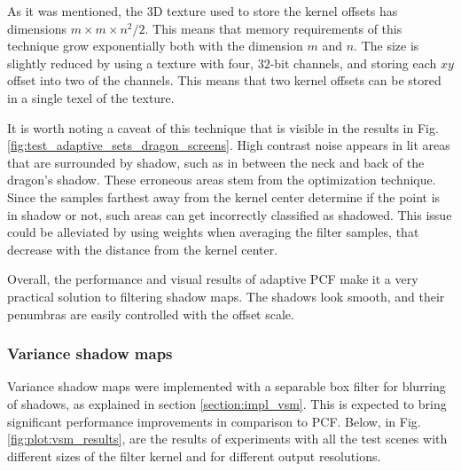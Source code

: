 As it was mentioned, the 3D texture used to store the kernel offsets has dimensions \(m\times m \times n^2/2\). This means that memory requirements of this technique grow exponentially both with the dimension \(m\) and \(n\). The size is slightly reduced by using a texture with four, \(32\)-bit channels, and storing each \(xy\) offset into two of the channels. This means that two kernel offsets can be stored in a single texel of the texture.

It is worth noting a caveat of this technique that is visible in the results in Fig. \ref{fig:test_adaptive_sets_dragon_screens}. High contrast noise appears in lit areas that are surrounded by shadow, such as in between the neck and back of the dragon's shadow. These erroneous areas stem from the optimization technique. Since the samples farthest away from the kernel center determine if the point is in shadow or not, such areas can get incorrectly classified as shadowed. This issue could be alleviated by using weights when averaging the filter samples, that decrease with the distance from the kernel center.

Overall, the performance and visual results of adaptive PCF make it a very practical solution to filtering shadow maps. The shadows look smooth, and their penumbras are easily controlled with the offset scale.

\subsubsection{Variance shadow maps}
Variance shadow maps were implemented with a separable box filter for blurring of shadows, as explained in section \ref{section:impl_vsm}. This is expected to bring significant performance improvements in comparison to PCF. Below, in Fig. \ref{fig:plot:vsm_results}, are the results of experiments with all the test scenes with different sizes of the filter kernel and for different output resolutions.

